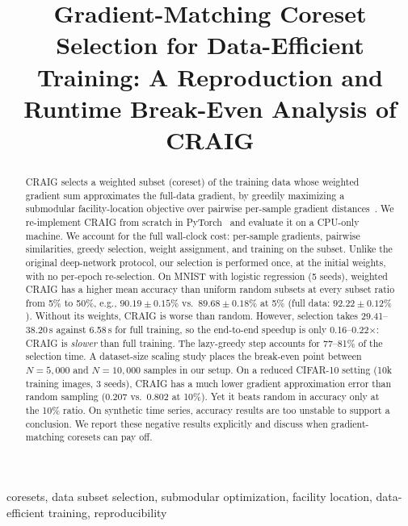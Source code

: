 \documentclass[conference]{IEEEtran}
\begin{document}
\title{Gradient-Matching Coreset Selection for Data-Efficient Training: A Reproduction and Runtime Break-Even Analysis of CRAIG}

\author{\and{}\and{}\and{}}

\maketitle

\begin{abstract}
CRAIG selects a weighted subset (coreset) of the training data whose weighted gradient sum approximates the full-data gradient, by greedily maximizing a submodular facility-location objective over pairwise per-sample gradient distances~\cite{mirzasoleiman2020craig}. We re-implement CRAIG from scratch in PyTorch~\cite{paszke2019pytorch} and evaluate it on a CPU-only machine. We account for the full wall-clock cost: per-sample gradients, pairwise similarities, greedy selection, weight assignment, and training on the subset. Unlike the original deep-network protocol, our selection is performed once, at the initial weights, with no per-epoch re-selection. On MNIST with logistic regression (5 seeds), weighted CRAIG has a higher mean accuracy than uniform random subsets at every subset ratio from 5\% to 50\%, e.g., $90.19\pm0.15\%$ vs.\ $89.68\pm0.18\%$ at 5\% (full data: $92.22\pm0.12\%$). Without its weights, CRAIG is worse than random. However, selection takes 29.41--38.20\,s against 6.58\,s for full training, so the end-to-end speedup is only 0.16--0.22$\times$: CRAIG is \emph{slower} than full training. The lazy-greedy step accounts for 77--81\% of the selection time. A dataset-size scaling study places the break-even point between $N{=}5{,}000$ and $N{=}10{,}000$ samples in our setup. On a reduced CIFAR-10 setting (10k training images, 3 seeds), CRAIG has a much lower gradient approximation error than random sampling (0.207 vs.\ 0.802 at 10\%). Yet it beats random in accuracy only at the 10\% ratio. On synthetic time series, accuracy results are too unstable to support a conclusion. We report these negative results explicitly and discuss when gradient-matching coresets can pay off.
\end{abstract}

\begin{IEEEkeywords}
coresets, data subset selection, submodular optimization, facility location, data-efficient training, reproducibility
\end{IEEEkeywords}
\end{document}
